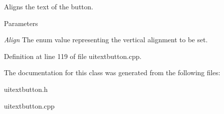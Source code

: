 Aligns the text of the button. 


\begin{DoxyParams}{Parameters}
\item[{\em Align}]The enum value representing the vertical alignment to be set. \end{DoxyParams}


Definition at line 119 of file uitextbutton.cpp.



The documentation for this class was generated from the following files:\begin{DoxyCompactItemize}
\item 
uitextbutton.h\item 
uitextbutton.cpp\end{DoxyCompactItemize}
